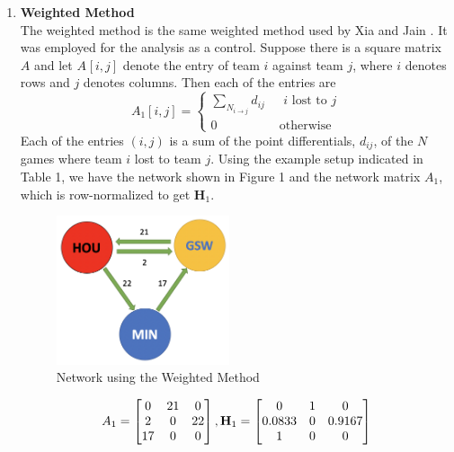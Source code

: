 \documentclass[12pt]{article}%
\begin{document}
\begin{enumerate}
\item \textbf{Weighted Method}\\
  \null\quad\quad The weighted method is the same weighted method used by Xia and Jain \cite{XJ}. It was employed for the analysis as a control. Suppose there is a square matrix $A$ and let $A_{}[i,j]$ denote the entry of team $i$ against team $j$, where $i$ denotes rows and $j$ denotes columns. Then each of the entries are
  \[
  A_{1}[i,j]=
  \begin{cases}
  \sum_{N_{i\rightarrow j}}d_{ij} &\text{ $i$ lost to $j$}\\
  0 &\text{ otherwise}
  \end{cases}
  \]
  Each of the entries $(i,j)$ is a sum of the point differentials, $d_{ij}$, of the $N$ games where team $i$ lost to team $j$. Using the example setup indicated in Table 1, we have the network shown in Figure 1 and the network matrix $A_1$, which is row-normalized to get $\textbf{H}_1$.
  \begin{figure}[H]
	\centering
	\includegraphics[width=2in]{./images/weighted.png}
	\caption[Network using the Weighted Method]{Network using the Weighted Method}
\end{figure}
\begin{align*}
A_1 =\begin{bmatrix}0 & 21 & 0\\2 & 0 & 22\\17 & 0 & 0\end{bmatrix}, \textbf H_1=\begin{bmatrix}0 & 1 & 0\\0.0833 & 0 & 0.9167\\1 & 0 & 0\end{bmatrix}
\end{align*}


\end{enumerate}
\end{document}
